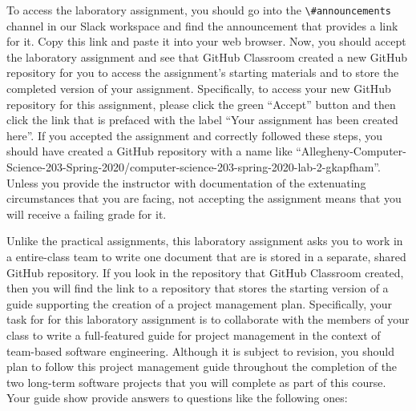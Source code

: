 \documentclass[11pt]{article}
\newcommand{\channel}[1]{\lstinline{#1}}
\begin{document}
To access the laboratory assignment, you should go into the
\channel{\#announcements} channel in our Slack workspace and find the
announcement that provides a link for it. Copy this link and paste it into your
web browser. Now, you should accept the laboratory assignment and see that
GitHub Classroom created a new GitHub repository for you to access the
assignment's starting materials and to store the completed version of your
assignment. Specifically, to access your new GitHub repository for this
assignment, please click the green ``Accept'' button and then click the link
that is prefaced with the label ``Your assignment has been created here''. If
you accepted the assignment and correctly followed these steps, you should have
created a GitHub repository with a name like
``Allegheny-Computer-Science-203-Spring-2020/computer-science-203-spring-2020-lab-2-gkapfham''.
Unless you provide the instructor with documentation of the extenuating
circumstances that you are facing, not accepting the assignment means that you
will receive a failing grade for it.


Unlike the practical assignments, this laboratory assignment asks you to work in
a entire-class team to write one document that are is stored in a separate,
shared GitHub repository. If you look in the repository that GitHub Classroom
created, then you will find the link to a repository that stores the starting
version of a guide supporting the creation of a project management plan.
%
Specifically, your task for for this laboratory assignment is to collaborate
with the members of your class to write a full-featured guide for project
management in the context of team-based software engineering. Although it is
subject to revision, you should plan to follow this project management guide
throughout the completion of the two long-term software projects that you will
complete as part of this course. Your guide show provide answers to questions
like the following ones:
\end{document}
